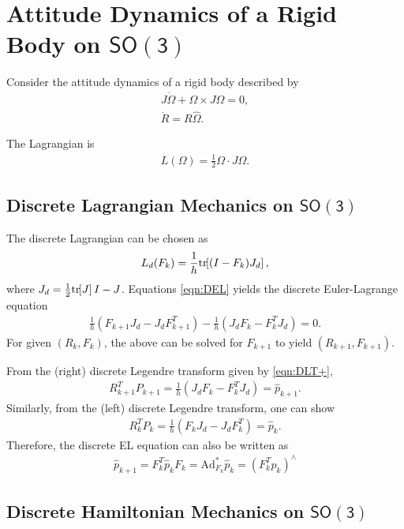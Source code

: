 \documentclass[letterpaper, 10pt, conference]{ieeeconf}
\newcommand{\bracket}[1]{\ensuremath{\left[ #1 \right]}}
\newcommand{\tr}[1]{\mbox{tr}\ensuremath{\negthickspace\bracket{#1}}}
\newcommand{\SO}{\ensuremath{\mathsf{SO(3)}}}
\newcommand{\Ad}{\ensuremath{\mathrm{Ad}}}
\begin{document}
\section{Attitude Dynamics of a Rigid Body on $\SO$}

Consider the attitude dynamics of a rigid body described by
\begin{gather*}
    J\dot\Omega + \Omega\times J\Omega = 0, \\
    \dot R = R\hat\Omega.
\end{gather*}

The Lagrangian is
\begin{align*}
    L(\Omega) = \frac{1}{2}\Omega \cdot J\Omega.
\end{align*}



\subsection{Discrete Lagrangian Mechanics on $\SO$}

The discrete Lagrangian can be chosen as
\begin{align*}
    L_d (F_k) = \frac{1}{h} \tr{ (I-F_k) J_d},
\end{align*}
where $J_d = \frac{1}{2}\tr{J}I- J$.
Equations \eqref{eqn:DEL} yields the discrete Euler-Lagrange equation
\begin{align*}
    \frac{1}{h} ( F_{k+1}J_d - J_d F_{k+1}^T ) -\frac{1}{h} (J_d F_k - F_k^T J_d) = 0.
\end{align*}
For given $(R_k,F_k)$, the above can be solved for $F_{k+1}$ to yield $(R_{k+1}, F_{k+1})$.

From the (right) discrete Legendre transform given by \eqref{eqn:DLT+},
\begin{align}
    R_{k+1}^T P_{k+1}  = \frac{1}{h}(J_d F_k - F_k^T J_d) =\hat p_{k+1}. \label{eqn:Pkp}
\end{align}
Similarly, from the (left) discrete Legendre transform, one can show
\begin{align*}
    R_k^T P_k = \frac{1}{h} (F_k J_d - J_d F_k^T) = \hat p_k.
\end{align*}
Therefore, the discrete EL equation can also be written as
\begin{align*}
    \hat p_{k+1} = F_k^T \hat p_k F_k  = \Ad^*_{F_k} \hat p_k = (F_k^Tp_k)^\wedge
\end{align*}

\subsection{Discrete Hamiltonian Mechanics on $\SO$}
\end{document}
